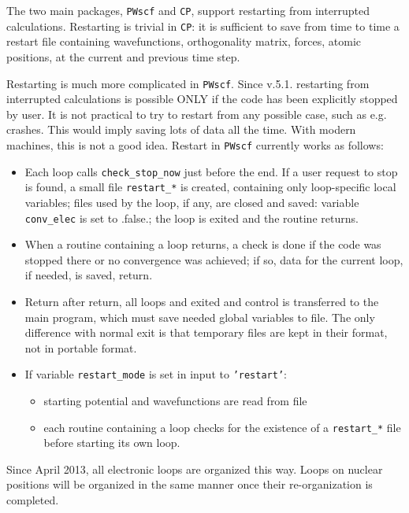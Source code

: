 \documentclass[12pt,a4paper]{article}
\begin{document}
The two main packages, \texttt{PWscf} and \texttt{CP}, support
restarting from interrupted calculations. Restarting is trivial
in \texttt{CP}: it is sufficient to save from time to time a
restart file containing wavefunctions, orthogonality matrix,
forces, atomic positions, at the current and previous time step.

Restarting is much more complicated in  \texttt{PWscf}. Since v.5.1.
restarting from interrupted calculations is possible ONLY if the code
has been explicitly stopped by user. It is not practical to try to
restart from any possible case, such as e.g. crashes. This would
imply saving lots of data all the time. With modern machines, this is
not a good idea. Restart in  \texttt{PWscf} currently works as follows:
\begin{itemize}
\item Each loop calls \texttt{check\_stop\_now} just before the end.
  If a user request to stop is found, a small file \texttt{restart\_*}
  is created, containing only loop-specific local variables;
  files used by the loop, if any, are closed and saved:
  variable \texttt{conv\_elec} is set to .false.;
  the loop is exited and the routine returns.
\item When a routine containing a loop returns, a check is done 
  if the code was stopped there or no convergence was achieved;
  if so, data for the current loop, if needed, is saved, return.
\item Return after return, all loops and exited and control is
  transferred to the main program, which must save needed global
  variables to file. The only difference with normal exit is that
  temporary files are kept in their format, not in portable format.
\item If variable \texttt{restart\_mode} is set in input to
  \texttt{'restart'}:
  \begin{itemize}
  \item starting potential and wavefunctions are read from file
  \item each routine containing a loop checks for the existence of a
    \texttt{restart\_*} file before starting its own loop.
  \end{itemize}
\end{itemize}
Since April 2013, all electronic loops are organized this way. Loops
on nuclear positions will be organized in the same manner once their
re-organization is completed.
\end{document}
